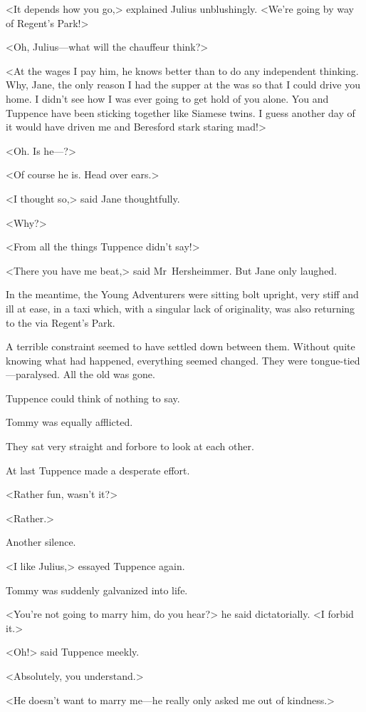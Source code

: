 <It depends how you go,> explained Julius unblushingly. <We're going by way of Regent's Park!>

<Oh, Julius—what will the chauffeur think?>

<At the wages I pay him, he knows better than to do any independent thinking. Why, Jane, the only reason I had the supper at the  was so that I could drive you home. I didn't see how I was ever going to get hold of you alone. You and Tuppence have been sticking together like Siamese twins. I guess another day of it would have driven me and Beresford stark staring mad!>

<Oh. Is he—?>

<Of course he is. Head over ears.>

<I thought so,> said Jane thoughtfully.

<Why?>

<From all the things Tuppence didn't say!>

<There you have me beat,> said Mr~Hersheimmer. But Jane only laughed.

In the meantime, the Young Adventurers were sitting bolt upright, very stiff and ill at ease, in a taxi which, with a singular lack of originality, was also returning to the  via Regent's Park.

A terrible constraint seemed to have settled down between them. Without quite knowing what had happened, everything seemed changed. They were tongue-tied—paralysed. All the old  was gone.

Tuppence could think of nothing to say.

Tommy was equally afflicted.

They sat very straight and forbore to look at each other.

At last Tuppence made a desperate effort.

<Rather fun, wasn't it?>

<Rather.>

Another silence.

<I like Julius,> essayed Tuppence again.

Tommy was suddenly galvanized into life.

<You're not going to marry him, do you hear?> he said dictatorially. <I forbid it.>

<Oh!> said Tuppence meekly.

<Absolutely, you understand.>

<He doesn't want to marry me—he really only asked me out of kindness.>

